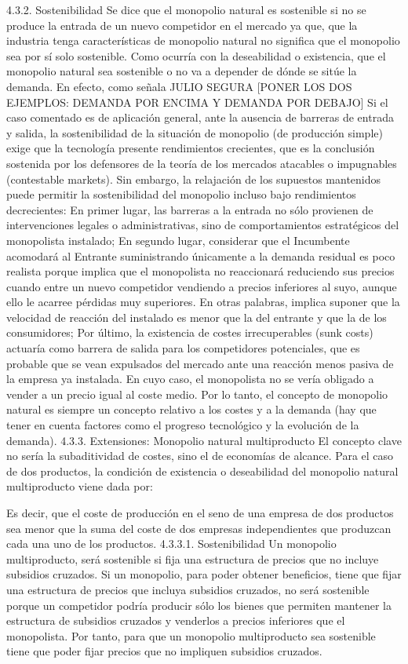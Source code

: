 \documentclass[10pt,a4paper]{article}
\begin{document}
4.3.2. Sostenibilidad
Se dice que el monopolio natural es sostenible si no se produce la entrada de un nuevo competidor en el mercado ya que, que la industria tenga características de monopolio natural no significa que el monopolio sea por sí solo sostenible.
Como ocurría con la deseabilidad o existencia, que el monopolio natural sea sostenible o no va a depender de dónde se sitúe la demanda. En efecto, como señala JULIO SEGURA 
[PONER LOS DOS EJEMPLOS: DEMANDA POR ENCIMA Y DEMANDA POR DEBAJO]
Si el caso comentado es de aplicación general, ante la ausencia de barreras de entrada y salida, la sostenibilidad de la situación de monopolio (de producción simple) exige que la tecnología presente rendimientos crecientes, que es la conclusión sostenida por los defensores de la teoría de los mercados atacables o impugnables (contestable markets).  Sin embargo, la relajación de los supuestos mantenidos puede permitir la sostenibilidad del monopolio incluso bajo rendimientos decrecientes: 
	En primer lugar, las barreras a la entrada no sólo provienen de intervenciones legales o administrativas, sino de comportamientos estratégicos del monopolista instalado; 
	En segundo lugar, considerar que el Incumbente acomodará al Entrante suministrando únicamente a la demanda residual es poco realista porque implica que el monopolista no reaccionará reduciendo sus precios cuando entre un nuevo competidor vendiendo a precios inferiores al suyo, aunque ello le acarree pérdidas muy superiores. En otras palabras, implica suponer que la velocidad de reacción del instalado es menor que la del entrante y que la de los consumidores; 
	Por último, la existencia de costes irrecuperables (sunk costs) actuaría como barrera de salida para los competidores potenciales, que es probable que se vean expulsados del mercado ante una reacción menos pasiva de la empresa ya instalada. En cuyo caso, el monopolista no se vería obligado a vender a un precio igual al coste medio.
Por lo tanto, el concepto de monopolio natural es siempre un concepto relativo a los costes y a la demanda (hay que tener en cuenta factores como el progreso tecnológico y la evolución de la demanda). 
4.3.3. Extensiones: Monopolio natural multiproducto
El concepto clave no sería la subaditividad de costes, sino el de economías de alcance. Para el caso de dos productos, la condición de existencia o deseabilidad del monopolio natural multiproducto viene dada por:

Es decir, que el coste de producción en el seno de una empresa de dos productos sea menor que la suma del coste de dos empresas independientes que produzcan cada una uno de los productos.
4.3.3.1. Sostenibilidad
Un monopolio multiproducto, será sostenible si fija una estructura de precios que no incluye subsidios cruzados. 
Si un monopolio, para poder obtener beneficios, tiene que fijar una estructura de precios que incluya subsidios cruzados, no será sostenible porque un competidor podría producir sólo los bienes que permiten mantener la estructura de subsidios cruzados y venderlos a precios inferiores que el monopolista. Por tanto, para que un monopolio multiproducto sea sostenible tiene que poder fijar precios que no impliquen subsidios cruzados. 
\end{document}
